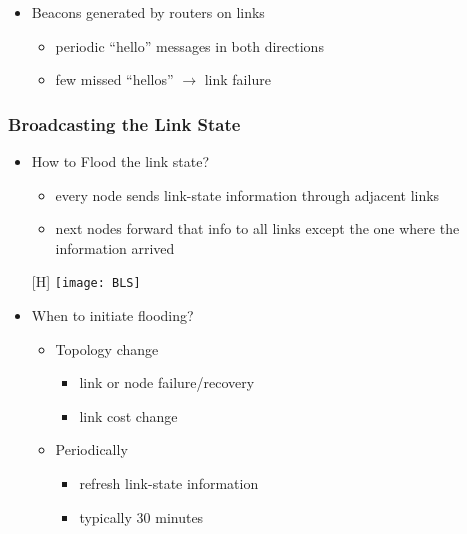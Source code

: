 \documentclass[../resumosRCOM.tex]{subfiles}
\begin{document}
\begin{itemize}
    \item Beacons generated by routers on links
    \begin{itemize}
        \item periodic “hello” messages in both directions
        \item few missed “hellos” $\rightarrow$ link failure
    \end{itemize}
\end{itemize}

\subsubsection{Broadcasting the Link State}

\begin{itemize}
    \item How to Flood the link state?
    \begin{itemize}
        \item every node sends link-state information through adjacent links
        \item next nodes forward that info to all links except the one where the information arrived
    \end{itemize}
    \begin{center}[H]
        \texttt{[image: BLS]}
    \end{center}
    \item When to initiate flooding?
    \begin{itemize}
        \item Topology change
        \begin{itemize}
            \item link or node failure/recovery
            \item link cost change
        \end{itemize}
    \end{itemize}
    \begin{itemize}
        \item Periodically
        \begin{itemize}
            \item refresh link-state information
            \item typically 30 minutes
        \end{itemize}
    \end{itemize}
\end{itemize}
\end{document}
